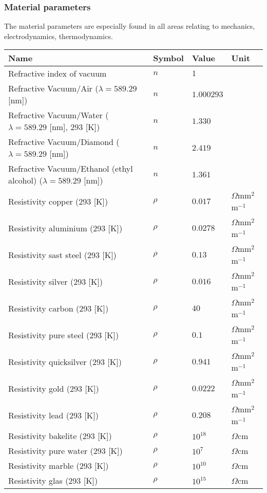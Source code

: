 	\subsubsection{Material parameters}
	The material parameters are especially found in all areas relating to mechanics, electrodynamics, thermodynamics.
	\begin{center}
	\begin{tabular}{||l|lll||}
	\hline
	{\textbf{Name}}&{\textbf{Symbol}}&{\textbf{Value}}&{\textbf{Unit}}\\
	\hline
	\hline
	Refractive index of vacuum						&$n$&$1$&\\
	Refractive Vacuum/Air ($\lambda=589.29$ [nm])	&$n$&$1.000293$&\\
	Refractive Vacuum/Water ($\lambda=589.29$ [nm], $293$ [K])	&$n$&$1.330$&\\
	Refractive Vacuum/Diamond ($\lambda=589.29$ [nm])	&$n$&$2.419$&\\
	Refractive Vacuum/Ethanol (ethyl alcohol) ($\lambda=589.29$ [nm])	&$n$&$1.361$&\\\hline
	Resistivity copper (293 [K])	&$\rho$&$0.017$& $\Omega$mm$^2$m$^{-1}$\\
	Resistivity aluminium (293 [K])	&$\rho$&$0.0278$& $\Omega$mm$^2$m$^{-1}$\\
	Resistivity sast steel (293 [K])	&$\rho$&$0.13$& $\Omega$mm$^2$m$^{-1}$\\
	Resistivity silver (293 [K])	&$\rho$&$0.016$& $\Omega$mm$^2$m$^{-1}$\\
	Resistivity carbon (293 [K])	&$\rho$&$40$& $\Omega$mm$^2$m$^{-1}$\\
	Resistivity pure steel (293 [K])	&$\rho$&$0.1$& $\Omega$mm$^2$m$^{-1}$\\
	Resistivity quicksilver (293 [K])	&$\rho$&$0.941$& $\Omega$mm$^2$m$^{-1}$\\
	Resistivity gold (293 [K])	&$\rho$&$0.0222$& $\Omega$mm$^2$m$^{-1}$\\
	Resistivity lead (293 [K])	&$\rho$&$0.208$& $\Omega$mm$^2$m$^{-1}$\\
	Resistivity bakelite (293 [K])	&$\rho$&$10^{18}$& $\Omega$cm\\
	Resistivity pure water (293 [K])	&$\rho$&$10^7$& $\Omega$cm\\
	Resistivity marble (293 [K])	&$\rho$&$10^{10}$& $\Omega$cm\\
	Resistivity glas (293 [K])	&$\rho$&$10^{15}$& $\Omega$cm\\
	\hline
	\end{tabular}
	\end{center}
	
